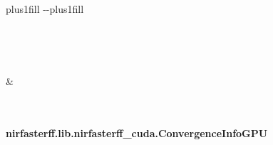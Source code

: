 \documentclass[letterpaper,10pt,english]{sphinxmanual}
\begin{document}
\begin{savenotes}
\sphinxatlongtablestart
\sphinxthistablewithglobalstyle
\sphinxthistablewithnovlinesstyle
\makeatletter
  \LTleft \@totalleftmargin plus1fill
  \LTright\dimexpr\columnwidth-\@totalleftmargin-\linewidth\relax plus1fill
\makeatother
\begin{longtable}{}
\sphinxtoprule
\endfirsthead

\\
\sphinxtoprule
\endhead

\sphinxbottomrule
{}\\
\endfoot

\endlastfoot
\sphinxtableatstartofbodyhook
\begin{varwidth}[t]{}
\sphinxAtStartPar
{\hyperref[\detokenize{_autosummary/nirfasterff.lib.nirfasterff_cuda.ConvergenceInfoGPU:nirfasterff.lib.nirfasterff_cuda.ConvergenceInfoGPU}]{}}
\sphinxbeforeendvarwidth
\end{varwidth}%
&\begin{varwidth}[t]{}
\sphinxAtStartPar

\sphinxbeforeendvarwidth
\end{varwidth}%
\\
\sphinxbottomrule
\end{longtable}
\sphinxtableafterendhook
\sphinxatlongtableend
\end{savenotes}

\sphinxstepscope


\paragraph{nirfasterff.lib.nirfasterff\_cuda.ConvergenceInfoGPU}
\label{\detokenize{_autosummary/nirfasterff.lib.nirfasterff_cuda.ConvergenceInfoGPU:nirfasterff-lib-nirfasterff-cuda-convergenceinfogpu}}\label{\detokenize{_autosummary/nirfasterff.lib.nirfasterff_cuda.ConvergenceInfoGPU::doc}}
\end{document}
